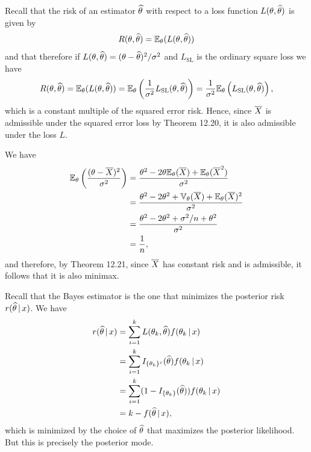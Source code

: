 \begin{ex}
  Recall that the risk of an estimator $\widehat{\theta}$ with respect to a loss
  function $L(\theta,\widehat{\theta})$ is given by
  \[
    R(\theta,\widehat{\theta})=\mathbb{E}_\theta(L(\theta,\widehat{\theta}))
  \]
  and that therefore if $L(\theta,\widehat{\theta})=(\theta-\widehat{\theta})^2/\sigma^2$
  and $L_\text{SL}$ is the ordinary square loss we have
  \[
    R(\theta,\widehat{\theta})=\mathbb{E}_\theta(L(\theta,\widehat{\theta}))
    =\mathbb{E}_\theta\left(\frac{1}{\sigma^2}L_\text{SL}(\theta,\widehat{\theta})\right)
    =\frac{1}{\sigma^2}\mathbb{E}_\theta\left(L_\text{SL}(\theta,\widehat{\theta})\right),
  \]
  which is a constant multiple of the squared error risk. Hence, since $\overline{X}$
  is admissible under the squared error loss by Theorem 12.20, it is also
  admissible under the loss $L$.

  We have
  \begin{align*}
    \mathbb{E}_{\theta}\left(\frac{(\theta-\overline{X})^2}{\sigma^2}\right)
     & =\frac{\theta^2-2\theta\mathbb{E}_\theta(\overline{X})+\mathbb{E}_\theta(\overline{X}^2)}{\sigma^2}    \\
     & =\frac{\theta^2-2\theta^2+\mathbb{V}_\theta(\overline{X})+\mathbb{E}_\theta(\overline{X})^2}{\sigma^2} \\
     & =\frac{\theta^2-2\theta^2+\sigma^2/n+\theta^2}{\sigma^2}                                 \\
     & =\frac{1}{n},
  \end{align*}
  and therefore, by Theorem 12.21, since $\overline{X}$ has constant risk and is
  admissible, it follows that it is also minimax.
\end{ex}

\begin{ex}
  Recall that the Bayes estimator is the one that minimizes the posterior risk
  $r(\widehat{\theta}\,|\, x)$. We have
  \begin{align*}
    r(\widehat{\theta}\,|\, x)
     & =\sum_{i=1}^k L(\theta_k,\widehat{\theta})f(\theta_k\,|\,x)           \\
     & =\sum_{i=1}^k I_{\{\theta_k\}^c}(\widehat{\theta})f(\theta_k\,|\,x)   \\
     & =\sum_{i=1}^k (1-I_{\{\theta_k\}}(\widehat{\theta}))f(\theta_k\,|\,x) \\
     & =k-f(\widehat{\theta}\,|\,x),
  \end{align*}
  which is minimized by the choice of $\widehat{\theta}$ that maximizes the posterior
  likelihood. But this is precisely the posterior mode.
\end{ex}

